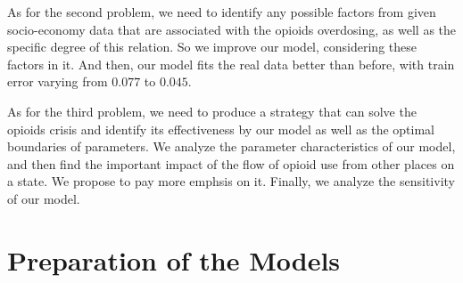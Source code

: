 As for the second problem, we need to identify any possible factors from given socio-economy data that are associated with the opioids overdosing, as well as the specific degree of this relation. So we improve our model, considering these factors in it. And then, our model fits the real data better than before, with train error varying from $0.077$ to $0.045$.

As for the third problem, we need to produce a strategy that can solve the opioids crisis and identify its effectiveness by our model as well as the optimal boundaries of parameters. We analyze the parameter characteristics of our model, and then find the important impact of the flow of opioid use from other places on a state. We propose to pay more emphsis on it.
Finally, we analyze the sensitivity of our model.


\section{Preparation of the Models}
